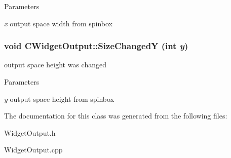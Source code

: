 \begin{DoxyParams}{Parameters}
\item[{\em x}]output space width from spinbox \end{DoxyParams}
\hypertarget{classCWidgetOutput_ad71a09c6e75893732ab306ebf235ae3f}{
\subsubsection[{SizeChangedY}]{\setlength{\rightskip}{0pt plus 5cm}void CWidgetOutput::SizeChangedY (int {\em y})}}
\label{classCWidgetOutput_ad71a09c6e75893732ab306ebf235ae3f}
output space height was changed


\begin{DoxyParams}{Parameters}
\item[{\em y}]output space height from spinbox \end{DoxyParams}


The documentation for this class was generated from the following files:\begin{DoxyCompactItemize}
\item 
WidgetOutput.h\item 
WidgetOutput.cpp\end{DoxyCompactItemize}
